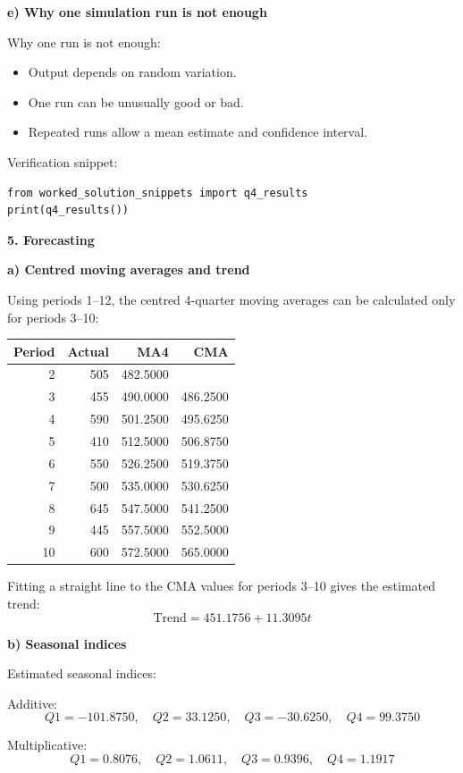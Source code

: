 \documentclass[11pt,a4paper]{article}
\begin{document}
\textbf{e) Why one simulation run is not enough}

Why one run is not enough:
\begin{itemize}
\item Output depends on random variation.
\item One run can be unusually good or bad.
\item Repeated runs allow a mean estimate and confidence interval.
\end{itemize}

Verification snippet:
\begin{verbatim}
from worked_solution_snippets import q4_results
print(q4_results())
\end{verbatim}

\textbf{5. Forecasting}

\textbf{a) Centred moving averages and trend}

Using periods 1--12, the centred 4-quarter moving averages can be calculated only for periods 3--10:

\begin{center}
\begin{tabular}{rrrr}
\toprule
Period & Actual & MA4 & CMA \\
\midrule
2  & 505 & 482.5000 &  \\
3  & 455 & 490.0000 & 486.2500 \\
4  & 590 & 501.2500 & 495.6250 \\
5  & 410 & 512.5000 & 506.8750 \\
6  & 550 & 526.2500 & 519.3750 \\
7  & 500 & 535.0000 & 530.6250 \\
8  & 645 & 547.5000 & 541.2500 \\
9  & 445 & 557.5000 & 552.5000 \\
10 & 600 & 572.5000 & 565.0000 \\
\bottomrule
\end{tabular}
\end{center}

Fitting a straight line to the CMA values for periods 3--10 gives the estimated trend:
\[
\text{Trend} = 451.1756 + 11.3095t
\]

\textbf{b) Seasonal indices}

Estimated seasonal indices:

Additive:
\[
Q1 = -101.8750, \quad Q2 = 33.1250, \quad Q3 = -30.6250, \quad Q4 = 99.3750
\]

Multiplicative:
\[
Q1 = 0.8076, \quad Q2 = 1.0611, \quad Q3 = 0.9396, \quad Q4 = 1.1917
\]
\end{document}
